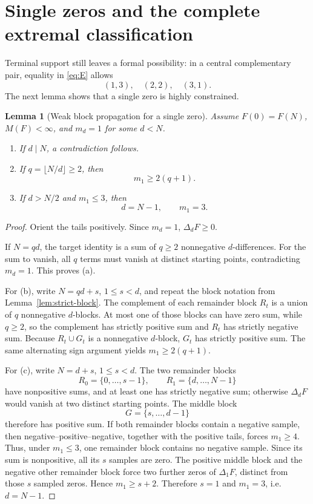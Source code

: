\documentclass[11pt]{article}
\newtheorem{lemma}[theorem]{Lemma}
\theoremstyle{definition}
\theoremstyle{remark}
\begin{document}
\section{Single zeros and the complete extremal classification}

Terminal support still leaves a formal possibility: in a central
complementary pair, equality in \eqref{eq:E} allows
\[
(1,3),\quad(2,2),\quad(3,1).
\]
The next lemma shows that a single zero is highly constrained.

\begin{lemma}[Weak block propagation for a single zero]\label{lem:single}
Assume \(F(0)=F(N)\), \(M(F)<\infty\), and \(m_d=1\) for some \(d<N\).

\begin{enumerate}[label=(\alph*)]
\item If \(d\mid N\), a contradiction follows.
\item If \(q=\lfloor N/d\rfloor\ge2\), then
\[
m_1\ge2(q+1).
\]
\item If \(d>N/2\) and \(m_1\le3\), then
\[
d=N-1,\qquad m_1=3.
\]
\end{enumerate}
\end{lemma}

\begin{proof}
Orient the tails positively.  Since \(m_d=1\),
\(\Delta_dF\ge0\).

If \(N=qd\), the target identity is a sum of \(q\ge2\) nonnegative
\(d\)-differences.  For the sum to vanish, all \(q\) terms must vanish
at distinct starting points, contradicting \(m_d=1\).  This proves (a).

For (b), write \(N=qd+s\), \(1\le s<d\), and repeat the block notation
from Lemma~\ref{lem:strict-block}.  The complement of each remainder
block \(R_t\) is a union of \(q\) nonnegative \(d\)-blocks.  At most one
of those blocks can have zero sum, while \(q\ge2\), so the complement
has strictly positive sum and \(R_t\) has strictly negative sum.
Because \(R_t\cup G_t\) is a nonnegative \(d\)-block, \(G_t\) has
strictly positive sum.  The same alternating sign argument yields
\(m_1\ge2(q+1)\).

For (c), write \(N=d+s\), \(1\le s<d\).  The two remainder blocks
\[
R_0=\{0,\ldots,s-1\},
\qquad
R_1=\{d,\ldots,N-1\}
\]
have nonpositive sums, and at least one has strictly negative sum;
otherwise \(\Delta_dF\) would vanish at two distinct starting points.
The middle block
\[
G=\{s,\ldots,d-1\}
\]
therefore has positive sum.  If both remainder blocks contain a negative
sample, then negative--positive--negative, together with the positive
tails, forces \(m_1\ge4\).  Thus, under \(m_1\le3\), one remainder block
contains no negative sample.  Since its sum is nonpositive, all its
\(s\) samples are zero.  The positive middle block and the negative
other remainder block force two further zeros of \(\Delta_1F\), distinct
from those \(s\) sampled zeros.  Hence \(m_1\ge s+2\).  Therefore
\(s=1\) and \(m_1=3\), i.e. \(d=N-1\).
\end{proof}
\end{document}
